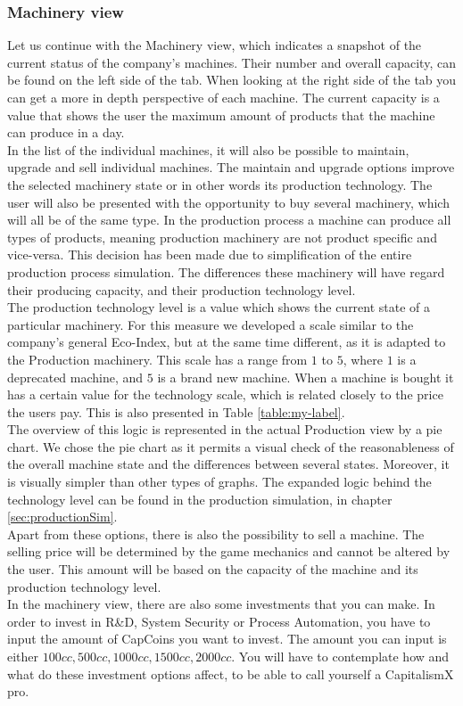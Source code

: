 \subsubsection{Machinery view} 
\label{sub:MachineryView}
Let us continue with the Machinery view, which indicates a snapshot of the current status of the company’s machines. Their number and overall capacity, can be found on the left side of the tab. When looking at the right side of the tab you can get a more in depth perspective of each machine. The current capacity is a value that shows the user the maximum amount of products that the machine can produce in a day. \\
 In the list of the individual machines, it will also be possible to maintain, upgrade and sell individual machines. The maintain and upgrade options improve the selected machinery state or in other words its production technology. 
The user will also be presented with the opportunity to buy several machinery, which will all be of the same type. In the production process a machine can produce all types of products, meaning production machinery are not product specific and vice-versa. This decision has been made due to simplification of the entire production process simulation. The differences these machinery will have regard their producing capacity, and their production technology level. \\
The production technology level is a value which shows the current state of a particular machinery. For this measure we developed a scale similar to the company’s general Eco-Index, but at the same time different, as it is adapted to the Production machinery.  This scale has a range from $1$ to $5$, where $1$ is a deprecated machine, and $5$ is a brand new machine. When a machine is bought it has a certain value for the technology scale, which is related closely to the price the users pay. This is also presented in Table \ref{table:my-label}. \\
The overview of this logic is represented in the actual Production view by a pie chart. We chose the pie chart as it permits a visual check of the reasonableness of the overall machine state and the differences between several states. Moreover, it is visually simpler than other types of graphs.
 The expanded logic behind the technology level can be found in the production simulation, in chapter \ref{sec:productionSim}.\\
Apart from these options, there is also the possibility to sell a machine. The selling price will be determined by the game mechanics and cannot be altered by the user. This amount will be based on the capacity of the machine and its production technology level.\\
In the machinery view, there are also some investments that you can make. In order to invest in R\&D, System Security or Process Automation, you have to input the amount of CapCoins you want to invest. The amount you can input is either $100cc,500cc,1000cc,1500cc,2000cc$. You will have to contemplate how and what do these investment options affect, to be able to call yourself a CapitalismX pro.\\


